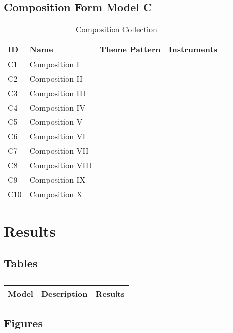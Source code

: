 \subsection{Composition Form Model C}


\begin{table}[H]
\caption{Composition Collection}	
\begin{tabular}{p{1cm}p{4cm}p{2cm}p{1cm}p{1cm}}
\hline
ID & Name & Theme Pattern & Instruments & \\
\hline 
C1 & Composition I &  &  & \\
C2 & Composition II &  &  & \\
C3 & Composition III &  & \\
C4 & Composition IV & & \\
C5 & Composition V & & & \\
\hline 
C6 & Composition VI &  &  & \\
C7 & Composition VII &  &  & \\
C8 & Composition VIII &  & \\
C9 & Composition IX & & \\
C10 & Composition X & & & \\
\end{tabular}
\end{table}


\section{Results}

\subsection{Tables}

\centering	
\begin{table}[H]\tiny
	\caption{}	
	\begin{tabular}{r|p{4cm}|l}
		\hline	
		Model & Description & Results \\
		\hline 
		\hline 
	\end{tabular}
\end{table}

\subsection{Figures}

